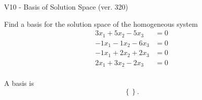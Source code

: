 \begin{exercise}
  \begin{exerciseTitle}V10 - Basis of Solution Space (ver. 320)\end{exerciseTitle}
  \begin{exerciseStatement}
    Find a basis for the solution space of the homogeneous system 
\begin{align*}
 3 x_ 1 + 5 x_ 2 -5 x_ 3 &= 0  \\ 
  -1 x_ 1 -1 x_ 2 -6 x_ 3 &= 0  \\ 
  -1 x_ 1 + 2 x_ 2 + 2 x_ 3 &= 0  \\ 
  2 x_ 1 + 3 x_ 2 -2 x_ 3 &= 0  \\ 
 \end{align*}


 
  \end{exerciseStatement}

  \begin{exerciseAnswer}
   A basis is   
\[\left\{\right\}.\]

  


  \end{exerciseAnswer}
\end{exercise}